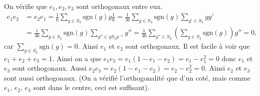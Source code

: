 \documentclass[french]{article}
\newcommand{\sgn}{\mathrm{sgn}}
\begin{document}
On vérifie que $e_1, e_2, e_3$ sont orthogonaux entre eux.
\begin{align*}
	e_1e_2 &= e_2 e_1 = \frac{1}{6}\sum_{g\in S_3} \sgn(g) g \frac{1}{6}
	= \frac{1}{36} \sum_{g\in S_3} \sgn(g)\sum_{g' \in S_3} gg' \\
	&= \frac{1}{36} \sum_{g\in S_3} \sgn(g) \sum_{g'' \in gS_3g^{-1}} g''
	= \frac{1}{36} \sum_{g'' \in S_3} \left(\sum_{g \in S_3} \sgn(g)\right) g'' =
	0,
\end{align*}
car $\sum_{g \in S_3} \sgn(g) = 0$. Ainsi $e_1$ et $e_2$ sont orthogonaux.
Il est facile à voir que $e_1 + e_2 + e_3 = 1$.
Ainsi on a que
$e_1e_3 = e_1(1 - e_1 - e_2) = e_1 - e_1^2 = 0$ donc $e_1$ et $e_3$ sont
orthogonaux.
Aussi $e_2 e_3 = e_2(1 - e_1 - e_2) = e_2 - e_2^2 = 0$. Ainsi $e_2$ et $e_3$
sont aussi orthogonaux. (On a vérifié l'orthogonalité que d'un coté, mais comme
$e_1$, $e_2$, $e_3$ sont dans le centre, ceci est suffisant).

\iffalse

Notons $a_g$ les coefficients de $e_3$, alors on a que $\sum_{g\in S_3} a_g =
0$. Alors
\begin{align*}
	e_1e_3 &= \frac{1}{6}\sum_{g \in S_3}g \sum_{g' \in S_3} a_{g'} g'
	= \frac{1}{6}\sum_{g' \in S_3} a_{g'} \sum_{g \in S_3} gg'\\
	&= \frac{1}{6} \sum_{g' \in S_3} a_{g'} \sum_{g'' \in g'S_3g'^{-1}} g''
	= \frac{1}{6} \sum_{g'' \in S_3} \left(\sum_{g' \in S_3} a_{g'}\right) g''
	= 0,
\end{align*}
donc $e_2$ et $e_3$ sont orthogonaux. Enfin,
\begin{align*}
	e_2e_3 &= \frac{1}{6}\sum_{g \in S_3}\sgn(g)g \sum_{g' \in S_3} a_{g'} g'
	= \frac{1}{6}\sum_{g' \in S_3} a_{g'} \sum_{g \in S_3} \sgn(g)gg'\\
	&= \frac{1}{6}\sum_{g' \in S_3} a_{g'} \sum_{g \in S_3} \sgn(gg')gg'
	= \frac{1}{6} \sum_{g' \in S_3} a_{g'} \sum_{g'' \in g'S_3g'^{-1}}
	\sgn(g'')g''\\
	&= \frac{1}{6} \sum_{g'' \in S_3} \left(\sum_{g' \in S_3} a_{g'}\right)
	\sgn(g'')g''
	= 0,
\end{align*}
et donc $e_2$ et $e_3$ sont orthogonaux. On a utilisé le fait que pour tous $g
\in S_3$, si $a_g \neq 0$, alors $\sgn(g) = 1$ par définition de $e_3$.

\fi
\end{document}
